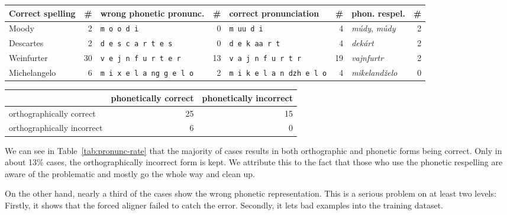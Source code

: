 \documentclass{itatnew}
\begin{document}
\begin{table*}[htpb]
\begin{center}
\begin{tabular}{|l r|l r|l r|l r|}
\hline
Correct spelling            & \#
	& wrong phonetic pronunc.   & \#
		& correct pronunciation     & \#
			& phon. respel.             & \# \\
\hline
Moody & 2 & \texttt{m o o d i} & 0 & \texttt{m uu d i} & 4 & {\em múdy}, {\em můdy} & 2 \\
Descartes & 2 & \texttt{d e s c a r t e s} & 0 & \texttt{d e k aa r t} & 4 & {\em dekárt} & 2   \\
Weinfurter & 30 & \texttt{v e j n f u r t e r} & 13 & \texttt{v a j n f u r t r} & 19 & {\em vajnfurtr} & 2 \\
Michelangelo & 6 & \texttt{m i x e l a ng g e l o} & 2 & \texttt{m i k e l a n dzh e l o} & 4 & {\em mikelandželo} & 0 \\
\hline
\end{tabular}
\caption{Examples of non-standard pronunciation in the manually transcribed data}\label{tab:pronunc}
\end{center}
\end{table*}

\begin{table*}[htpb]
\begin{center}
\begin{tabular}{|l|r|r|}
\hline
 & phonetically correct & phonetically incorrect \\
\hline
orthographically correct & 25 & 15 \\
\hline
orthographically incorrect & 6 & 0 \\
\hline
\end{tabular}
\caption{Success rate for phonetic and orthographic representation of foreign
words}\label{tab:pronunc-rate}
\end{center}
\end{table*}

We can see in Table~\ref{tab:pronunc-rate} that the majority of cases results in
both orthographic and phonetic forms being correct. Only in about 13\% cases,
the orthographically incorrect form is kept. We attribute this to the fact that
those who use the phonetic respelling are aware of the problematic and mostly
go the whole way and clean up.

On the other hand, nearly a third of the cases show the wrong phonetic
representation. This is a serious problem on at least two levels: Firstly, it
shows that the forced aligner failed to catch the error. Secondly, it lets bad
examples into the training dataset.
\end{document}
